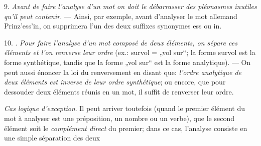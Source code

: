 {    9. \emph{Avant de faire l’analyse d’un mot on doit le débarrasser
      des pléonasmes inutiles qu’il peut contenir.} — Ainsi, par
    exemple, avant d’analyser le mot allemand \textup{Prinz’ess'in},
    on supprimera l’un des deux suffixes synonymes \textup{ess} ou
    \textup{in}.

    10. . \emph{Pour faire l'analyse d’un
      mot composé de deux éléments, on sépare ces éléments et l’on
      renverse leur ordre} (ex.: \textup{survol} = „vol sur“; la forme
    \textup{survol} est la forme synthétique, tandis que la forme „vol
    sur“ est la forme analytique). — On peut aussi énoncer la loi du
    renversement en disant que: \emph{l’ordre analytique de deux
      éléments est inverse de leur ordre synthétique}; ou encore, que
    pour dessouder deux éléments réunis en un mot, il suffit de
    renverser leur ordre.

    \emph{Cas logique d’exception}. Il peut arriver toutefois (quand
    le premier élément du mot à analyser est une préposition, un
    nombre ou un verbe), que le second élément soit le
    \emph{complément direct} du premier; dans ce cas, l’analyse
    consiste en une simple séparation des deux
  }

